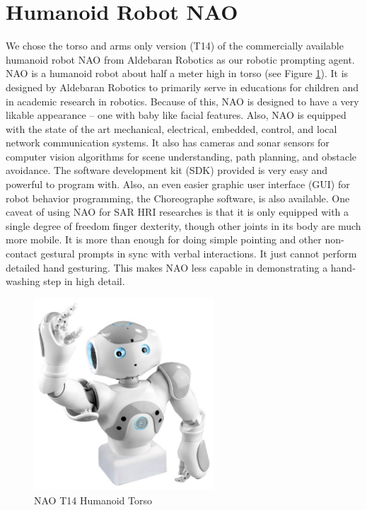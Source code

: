 \section{Humanoid Robot NAO}

We chose the torso and arms only version (T14) of the commercially available humanoid robot NAO from Aldebaran Robotics as our robotic prompting agent.  NAO is a humanoid robot about half a meter high in torso (see Figure \ref{fig:NAOColor}).  It is designed by Aldebaran Robotics to primarily serve in educations for children and in academic research in robotics.  Because of this, NAO is designed to have a very likable appearance -- one with baby like facial features.  Also, NAO is equipped with the state of the art mechanical, electrical, embedded, control, and local network communication systems.  It also has cameras and sonar sensors for computer vision algorithms for scene understanding, path planning, and obstacle avoidance.  The software development kit (SDK) provided is very easy and powerful to program with.  Also, an even easier graphic user interface (GUI) for robot behavior programming, the Choreographe software, is also available.  One caveat of using NAO for SAR HRI researches is that it is only equipped with a single degree of freedom finger dexterity, though other joints in its body are much more mobile.  It is more than enough for doing simple pointing and other non-contact gestural prompts in sync with verbal interactions.  It just cannot perform detailed hand gesturing.  This makes NAO less capable in demonstrating a hand-washing step in high detail.
\begin{figure} [H]
	\centering
	\includegraphics[width=0.6\textwidth]{./img/nao-torso.jpg}
	\caption{NAO T14 Humanoid Torso}
	\label{fig:NAOColor}
\end{figure}


